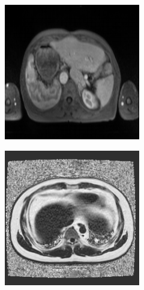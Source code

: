 \begin{figure}
        \begin{subfigure}[b]{0.25\textwidth}
                \centering
                \includegraphics[width=.95\linewidth]{img_hyperopt/abdo_1}
        \end{subfigure}%
        \begin{subfigure}[b]{0.25\textwidth}
                \centering
                \includegraphics[width=.95\linewidth]{img_hyperopt/abdo_2}

\end{subfigure}
\end{figure}
